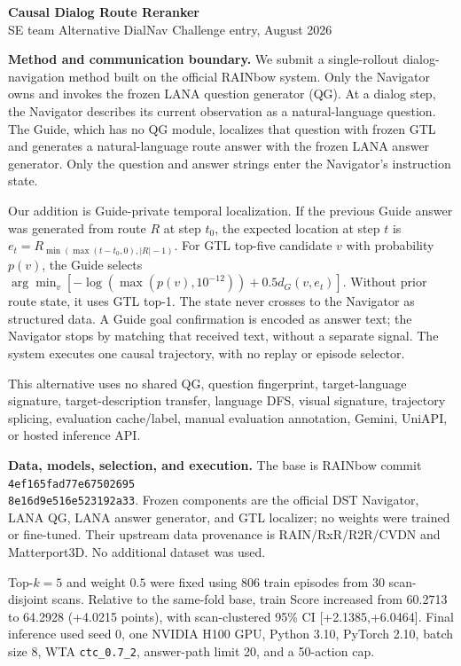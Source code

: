 \documentclass[9pt,a4paper]{article}
\newcommand{\sect}[1]{\vspace{2pt}\textbf{#1}\quad}
\begin{document}
\begin{center}
{\large\bfseries Causal Dialog Route Reranker}\\[-1pt]
{\small SE team \quad Alternative DialNav Challenge entry, August 2026}
\end{center}
\vspace{-5pt}

\sect{Method and communication boundary.}
We submit a single-rollout dialog-navigation method built on the official
RAINbow system. Only the Navigator owns and invokes the frozen LANA question
generator (QG). At a dialog step, the Navigator describes its current
observation as a natural-language question. The Guide, which has no QG module,
localizes that question with frozen GTL and generates a natural-language route
answer with the frozen LANA answer generator. Only the question and answer
strings enter the Navigator's instruction state.

Our addition is Guide-private temporal localization. If the previous Guide
answer was generated from route $R$ at step $t_0$, the expected location at
step $t$ is $e_t=R_{\min(\max(t-t_0,0),|R|-1)}$. For GTL top-five candidate
$v$ with probability $p(v)$, the Guide selects
$\arg\min_v[-\log(\max(p(v),10^{-12}))+0.5d_G(v,e_t)]$. Without prior route
state, it uses GTL top-1. The state never crosses to the Navigator as structured
data. A Guide goal confirmation is encoded as answer text; the Navigator stops
by matching that received text, without a separate signal. The system executes
one causal trajectory, with no replay or episode selector.

This alternative uses no shared QG, question fingerprint, target-language
signature, target-description transfer, language DFS, visual signature,
trajectory splicing, evaluation cache/label, manual evaluation annotation,
Gemini, UniAPI, or hosted inference API.

\sect{Data, models, selection, and execution.}
The base is RAINbow commit \texttt{4ef165fad77e67502695}\\[-1pt]
\texttt{8e16d9e516e523192a33}. Frozen components are the
official DST Navigator, LANA QG, LANA answer generator, and GTL localizer; no
weights were trained or fine-tuned. Their upstream data provenance is
RAIN/RxR/R2R/CVDN and Matterport3D. No additional dataset was used.

Top-$k=5$ and weight $0.5$ were fixed using 806 train episodes from 30
scan-disjoint scans. Relative to the same-fold base, train Score increased from
60.2713 to 64.2928 (+4.0215 points), with scan-clustered 95\% CI
[+2.1385,+6.0464]. Final inference used seed 0, one NVIDIA H100 GPU, Python
3.10, PyTorch 2.10, batch size 8, WTA \texttt{ctc\_0.7\_2}, answer-path limit
20, and a 50-action cap.
\end{document}
